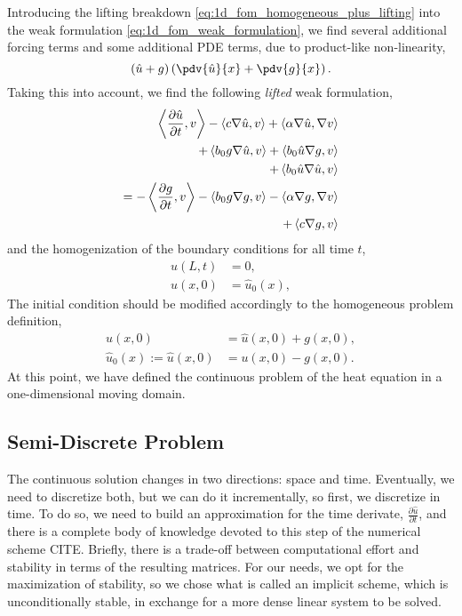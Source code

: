 \documentclass[../main.tex]{subfiles}
\newcommand{\inner}[2]{\left<#1, #2\right>}
\begin{document}
Introducing the lifting breakdown \eqref{eq:1d_fom_homogeneous_plus_lifting} into the weak formulation \eqref{eq:1d_fom_weak_formulation},
we find several additional forcing terms and some additional PDE terms, due to product-like non-linearity, 
\begin{equation}
    \left(\hat{u} + g\right)\left(\pdv{\hat{u}}{x} + \pdv{g}{x}\right).
\end{equation}
Taking this into account, we find the following \textit{lifted} weak formulation,
\begin{subequations}
    \label{eq:1d_fom_weak_formulation_homogeneous}
    \begin{align}
        \inner{\frac{\partial \hat{u}}{\partial t}}{v} - \inner{c \grad \hat{u}}{v} + \inner{\alpha \grad \hat{u}}{\grad v} \nonumber\\
        + \inner{b_0 g \grad \hat{u}}{v} 
        + \inner{b_0 \hat{u} \grad g}{v} \nonumber\\
        + \inner{b_0 \hat{u} \grad \hat{u}}{v} \nonumber\\
        = 
        - \inner{\frac{\partial g}{\partial t}}{v} - \inner{b_0 g \grad g}{v} - \inner{\alpha \grad g}{\grad v} \nonumber\\ 
        + \inner{c \grad g}{v}
    \end{align}
\end{subequations}
and the homogenization of the boundary conditions for all time $t$,
\begin{subequations}
    \begin{align}
        \hat{u}(L, t) &= 0, \\
        \hat{u}(x, 0) &= \hat{u}_0(x),
    \end{align}
\end{subequations}
The initial condition should be modified accordingly to the homogeneous problem definition, 
\begin{subequations}
    \begin{align}
    u(x,0) &= \hat{u}(x,0) + g(x,0), \\ 
    \hat{u}_0(x):= \hat{u}(x,0) &= u(x,0) - g(x,0) . 
    \end{align}
\end{subequations}
At this point, we have defined the continuous problem of the heat equation in a one-dimensional moving domain. 

\subsection{Semi-Discrete Problem}
The continuous solution changes in two directions: space and time.
Eventually, we need to discretize both, but we can do it incrementally, so first, we discretize in time. 
To do so, we need to build an approximation for the time derivate, $\frac{\partial \hat{u}}{\partial t}$, and there is a complete body of knowledge devoted to this step of the numerical scheme CITE. 
Briefly, there is a trade-off between computational effort and stability in terms of the resulting matrices.
For our needs, we opt for the maximization of stability, so we chose what is called an implicit scheme, which is unconditionally stable, in exchange for a more dense linear system to be solved. 
\end{document}
